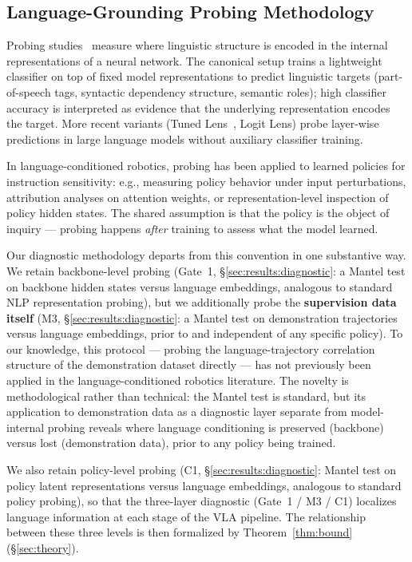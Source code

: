 \subsection{Language-Grounding Probing Methodology}
\label{sec:related:probing}

Probing studies~\cite{tenney2019bert_probing, hewitt2019structural_probing} measure where
linguistic structure is encoded in the internal representations of a neural network. The
canonical setup trains a lightweight classifier on top of fixed model representations to
predict linguistic targets (part-of-speech tags, syntactic dependency structure, semantic
roles); high classifier accuracy is interpreted as evidence that the underlying
representation encodes the target. More recent variants (Tuned
Lens~\cite{belrose2023tuned_lens}, Logit Lens) probe layer-wise predictions in large
language models without auxiliary classifier training.

In language-conditioned robotics, probing has been applied to learned policies for
instruction sensitivity: e.g., measuring policy behavior under input perturbations,
attribution analyses on attention weights, or representation-level inspection of policy
hidden states. The shared assumption is that the policy is the object of inquiry ---
probing happens \emph{after} training to assess what the model learned.

Our diagnostic methodology departs from this convention in one substantive way. We retain
backbone-level probing (Gate~1, \S\ref{sec:results:diagnostic}: a Mantel test on backbone
hidden states versus language embeddings, analogous to standard NLP representation
probing), but we additionally probe the \textbf{supervision data itself} (M3,
\S\ref{sec:results:diagnostic}: a Mantel test on demonstration trajectories versus language
embeddings, prior to and independent of any specific policy). To our knowledge, this
protocol --- probing the language-trajectory correlation structure of the demonstration
dataset directly --- has not previously been applied in the language-conditioned robotics
literature. The novelty is methodological rather than technical: the Mantel test is
standard, but its application to demonstration data as a diagnostic layer separate from
model-internal probing reveals where language conditioning is preserved (backbone) versus
lost (demonstration data), prior to any policy being trained.

We also retain policy-level probing (C1, \S\ref{sec:results:diagnostic}: Mantel test on
policy latent representations versus language embeddings, analogous to standard policy
probing), so that the three-layer diagnostic (Gate~1 / M3 / C1) localizes language
information at each stage of the VLA pipeline. The relationship between these three levels
is then formalized by Theorem~\ref{thm:bound} (\S\ref{sec:theory}).
